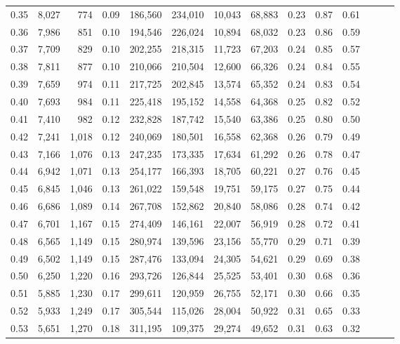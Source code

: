 \begin{tabular}{rrrrrrrrrrrrrr}
0.35 &  8,027 &    774 &  0.09 &  186,560 &  234,010 &  10,043 &  68,883 &  0.23 &  0.87 &      0.61 \\
0.36 &  7,986 &    851 &  0.10 &  194,546 &  226,024 &  10,894 &  68,032 &  0.23 &  0.86 &      0.59 \\
0.37 &  7,709 &    829 &  0.10 &  202,255 &  218,315 &  11,723 &  67,203 &  0.24 &  0.85 &      0.57 \\
0.38 &  7,811 &    877 &  0.10 &  210,066 &  210,504 &  12,600 &  66,326 &  0.24 &  0.84 &      0.55 \\
0.39 &  7,659 &    974 &  0.11 &  217,725 &  202,845 &  13,574 &  65,352 &  0.24 &  0.83 &      0.54 \\
0.40 &  7,693 &    984 &  0.11 &  225,418 &  195,152 &  14,558 &  64,368 &  0.25 &  0.82 &      0.52 \\
0.41 &  7,410 &    982 &  0.12 &  232,828 &  187,742 &  15,540 &  63,386 &  0.25 &  0.80 &      0.50 \\
0.42 &  7,241 &  1,018 &  0.12 &  240,069 &  180,501 &  16,558 &  62,368 &  0.26 &  0.79 &      0.49 \\
0.43 &  7,166 &  1,076 &  0.13 &  247,235 &  173,335 &  17,634 &  61,292 &  0.26 &  0.78 &      0.47 \\
0.44 &  6,942 &  1,071 &  0.13 &  254,177 &  166,393 &  18,705 &  60,221 &  0.27 &  0.76 &      0.45 \\
0.45 &  6,845 &  1,046 &  0.13 &  261,022 &  159,548 &  19,751 &  59,175 &  0.27 &  0.75 &      0.44 \\
0.46 &  6,686 &  1,089 &  0.14 &  267,708 &  152,862 &  20,840 &  58,086 &  0.28 &  0.74 &      0.42 \\
0.47 &  6,701 &  1,167 &  0.15 &  274,409 &  146,161 &  22,007 &  56,919 &  0.28 &  0.72 &      0.41 \\
0.48 &  6,565 &  1,149 &  0.15 &  280,974 &  139,596 &  23,156 &  55,770 &  0.29 &  0.71 &      0.39 \\
0.49 &  6,502 &  1,149 &  0.15 &  287,476 &  133,094 &  24,305 &  54,621 &  0.29 &  0.69 &      0.38 \\
0.50 &  6,250 &  1,220 &  0.16 &  293,726 &  126,844 &  25,525 &  53,401 &  0.30 &  0.68 &      0.36 \\
0.51 &  5,885 &  1,230 &  0.17 &  299,611 &  120,959 &  26,755 &  52,171 &  0.30 &  0.66 &      0.35 \\
0.52 &  5,933 &  1,249 &  0.17 &  305,544 &  115,026 &  28,004 &  50,922 &  0.31 &  0.65 &      0.33 \\
0.53 &  5,651 &  1,270 &  0.18 &  311,195 &  109,375 &  29,274 &  49,652 &  0.31 &  0.63 &      0.32 \\

\end{tabular}
